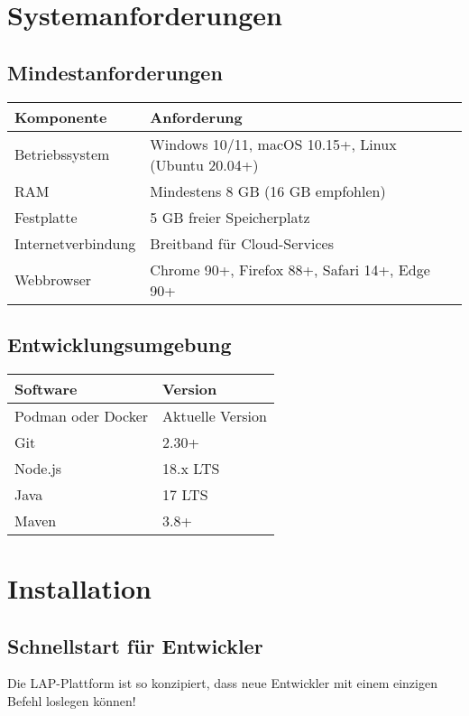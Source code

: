 \documentclass[a4paper,12pt]{article}
\begin{document}
\section{Systemanforderungen}

\subsection{Mindestanforderungen}
\begin{longtable}{|p{}|p{}|}
\hline
\textbf{Komponente} & \textbf{Anforderung} \\
\hline
Betriebssystem & Windows 10/11, macOS 10.15+, Linux (Ubuntu 20.04+) \\
\hline
RAM & Mindestens 8 GB (16 GB empfohlen) \\
\hline
Festplatte & 5 GB freier Speicherplatz \\
\hline
Internetverbindung & Breitband für Cloud-Services \\
\hline
Webbrowser & Chrome 90+, Firefox 88+, Safari 14+, Edge 90+ \\
\hline
\end{longtable}

\subsection{Entwicklungsumgebung}
\begin{longtable}{|p{}|p{}|}
\hline
\textbf{Software} & \textbf{Version} \\
\hline
Podman oder Docker & Aktuelle Version \\
\hline
Git & 2.30+ \\
\hline
Node.js & 18.x LTS \\
\hline
Java & 17 LTS \\
\hline
Maven & 3.8+ \\
\hline
\end{longtable}

\section{Installation}

\subsection{Schnellstart für Entwickler}

\begin{infobox}
Die LAP-Plattform ist so konzipiert, dass neue Entwickler mit einem einzigen Befehl loslegen können!
\end{infobox}
\end{document}
